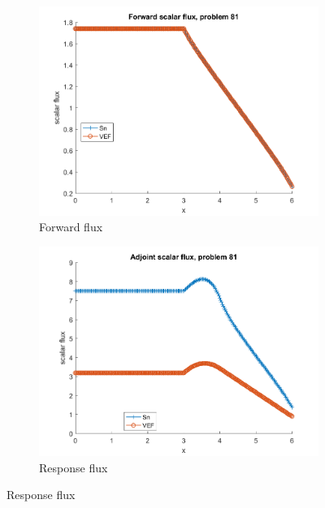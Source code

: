\documentclass{article}
\begin{document}
\begin{figure}[H]
\label{Case81Flux}
\centering
\begin{subfigure}{.5\textwidth}
  \centering
  \includegraphics[width=.98\linewidth]{IanProposal/figures2/81phi.png}
  \caption{Forward flux}
  \label{fig:sfig1}
\end{subfigure}%
\begin{subfigure}{.5\textwidth}
  \centering
  \includegraphics[width=.98\linewidth]{IanProposal/figures2/81phia.png}
  \caption{Response flux}
  \label{fig:sfig4}
\end{subfigure}%
\end{figure}
\end{document}
